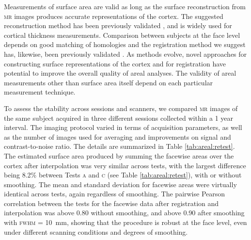 Measurements of surface area are valid as long as the surface reconstruction from \textsc{mr} images produces accurate representations of the cortex. The suggested reconstruction method has been previously validated \citep{Fischl2000}, and is widely used for cortical thickness measurements. Comparison between subjects at the face level depends on good matching of homologies and the registration method we suggest has, likewise, been previously validated \citep{Yeo2010, Klein2010}. As methods evolve, novel approaches for constructing surface representations of the cortex and for registration have potential to improve the overall quality of areal analyses. The validity of areal measurements other than surface area itself depend on each particular measurement technique.

To assess the stability across sessions and scanners, we compared \textsc{mr} images of the same subject acquired in three different sessions collected within a 1 year interval. The imaging protocol varied in terms of acquisition parameters, as well as the number of images used for averaging and improvements on signal and contrast-to-noise ratio. The details are summarized in Table \ref{tab:areal:retest}. The estimated surface area produced by summing the facewise areas over the cortex after interpolation was very similar across tests, with the largest difference being 8.2\% between Tests \textsc{a} and \textsc{c} (see Table \ref{tab:areal:retest}), with or without smoothing. The mean and standard deviation for facewise areas were virtually identical across tests, again regardless of smoothing. The pairwise Pearson correlation between the tests for the facewise data after registration and interpolation was above 0.80 without smoothing, and above 0.90 after smoothing with \textsc{fwhm} = 10~mm, showing that the procedure is robust at the face level, even under different scanning conditions and degrees of smoothing.

